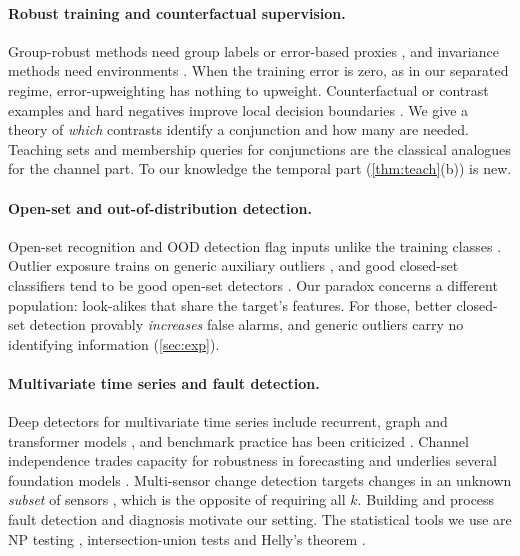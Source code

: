 \documentclass{article}
\theoremstyle{definition}
\theoremstyle{remark}
\renewcommand{\1}{\mathbf{1}}
\begin{document}
\paragraph{Robust training and counterfactual supervision.} Group-robust methods need group labels or error-based proxies \citep{sagawa2020,liu2021jtt,kirichenko2023}, and invariance methods need environments \citep{arjovsky2019}. When the training error is zero, as in our separated regime, error-upweighting has nothing to upweight. Counterfactual or contrast examples and hard negatives improve local decision boundaries \citep{kaushik2020,gardner2020,teney2020,robinson2021}. We give a theory of \emph{which} contrasts identify a conjunction and how many are needed. Teaching sets \citep{goldman1995,zilles2011} and membership queries for conjunctions \citep{angluin1988} are the classical analogues for the channel part. To our knowledge the temporal part (\cref{thm:teach}(b)) is new.

\paragraph{Open-set and out-of-distribution detection.} Open-set recognition and OOD detection flag inputs unlike the training classes \citep{scheirer2013,hendrycks2017,yang2024}. Outlier exposure trains on generic auxiliary outliers \citep{hendrycks2019}, and good closed-set classifiers tend to be good open-set detectors \citep{vaze2022}. Our paradox concerns a different population: look-alikes that share the target's features. For those, better closed-set detection provably \emph{increases} false alarms, and generic outliers carry no identifying information (\cref{sec:exp}).

\paragraph{Multivariate time series and fault detection.} Deep detectors for multivariate time series include recurrent, graph and transformer models \citep{hundman2018,su2019,zhao2020,deng2021,xu2022,tuli2022}, and benchmark practice has been criticized \citep{wu2023,kim2022,schmidl2022}. Channel independence trades capacity for robustness in forecasting \citep{nie2023,han2024} and underlies several foundation models \citep{goswami2024,das2024,ansari2024}. Multi-sensor change detection targets changes in an unknown \emph{subset} of sensors \citep{xie2013,page1954}, which is the opposite of requiring all $k$. Building and process fault detection and diagnosis \citep{katipamula2005,kim2018,zhao2019,downs1993} motivate our setting. The statistical tools we use are NP testing \citep{neyman1933,lehmann2005}, intersection-union tests \citep{berger1982,berger1996} and Helly's theorem \citep{helly1923}.
\end{document}
